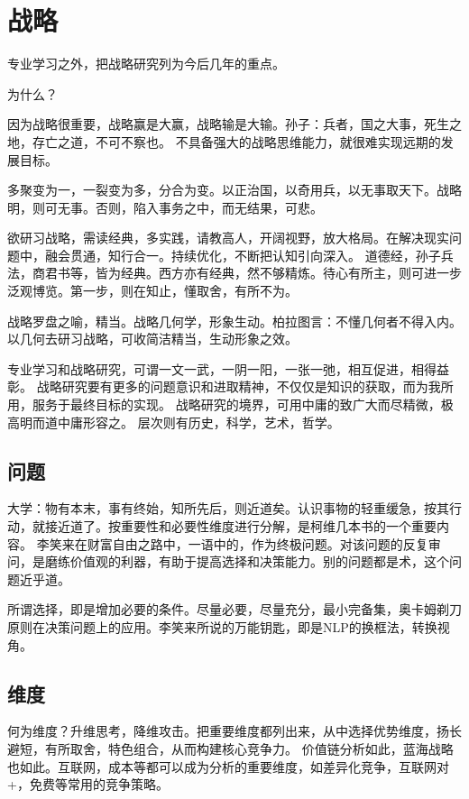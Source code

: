 \chapter{战略}

专业学习之外，把战略研究列为今后几年的重点。


为什么？

因为战略很重要，战略赢是大赢，战略输是大输。孙子：兵者，国之大事，死生之地，存亡之道，不可不察也。
不具备强大的战略思维能力，就很难实现远期的发展目标。

多聚变为一，一裂变为多，分合为变。以正治国，以奇用兵，以无事取天下。战略明，则可无事。否则，陷入事务之中，而无结果，可悲。

欲研习战略，需读经典，多实践，请教高人，开阔视野，放大格局。在解决现实问题中，融会贯通，知行合一。持续优化，不断把认知引向深入。
道德经，孙子兵法，商君书等，皆为经典。西方亦有经典，然不够精炼。待心有所主，则可进一步泛观博览。第一步，则在知止，懂取舍，有所不为。

战略罗盘之喻，精当。战略几何学，形象生动。柏拉图言：不懂几何者不得入内。以几何去研习战略，可收简洁精当，生动形象之效。

专业学习和战略研究，可谓一文一武，一阴一阳，一张一弛，相互促进，相得益彰。
战略研究要有更多的问题意识和进取精神，不仅仅是知识的获取，而为我所用，服务于最终目标的实现。
战略研究的境界，可用中庸的致广大而尽精微，极高明而道中庸形容之。
层次则有历史，科学，艺术，哲学。

\section{问题}

大学：物有本末，事有终始，知所先后，则近道矣。认识事物的轻重缓急，按其行动，就接近道了。按重要性和必要性维度进行分解，是柯维几本书的一个重要内容。
李笑来在财富自由之路中，一语中的，作为终极问题。对该问题的反复审问，是磨练价值观的利器，有助于提高选择和决策能力。别的问题都是术，这个问题近乎道。

所谓选择，即是增加必要的条件。尽量必要，尽量充分，最小完备集，奥卡姆剃刀原则在决策问题上的应用。李笑来所说的万能钥匙，即是NLP的换框法，转换视角。

\section{维度}

何为维度？升维思考，降维攻击。把重要维度都列出来，从中选择优势维度，扬长避短，有所取舍，特色组合，从而构建核心竞争力。
价值链分析如此，蓝海战略也如此。互联网，成本等都可以成为分析的重要维度，如差异化竞争，互联网对+，免费等常用的竞争策略。

